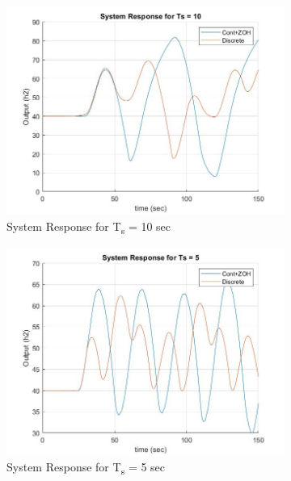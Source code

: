 \documentclass[a4paper,12pt,oneside,onecolumn]{article} %
\begin{document}
\begin{figure}[H]
\centering
\begin{subfigure}{0.4\textwidth}
  \includegraphics[width = \textwidth]{ex_8_1}
\caption{System Response for T\textsubscript{s} = 10 sec}
\end{subfigure}
\vspace{1em}
\begin{subfigure}{0.4\textwidth}
  \includegraphics[width = \textwidth]{ex_8_2}
\caption{System Response for T\textsubscript{s} = 5 sec}
\end{subfigure}
\vspace{1 em}
\begin{subfigure}{0.4\textwidth}

\end{subfigure}
\end{figure}
\end{document}
